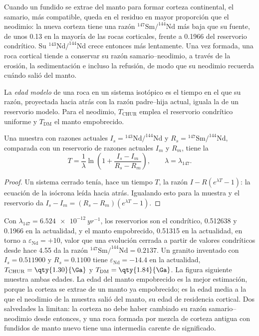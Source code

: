 Cuando un fundido se extrae del manto para formar corteza continental, el samario,
más compatible, queda en el residuo en mayor proporción que el neodimio: la nueva corteza tiene una
razón $^{147}\mathrm{Sm}/^{144}\mathrm{Nd}$ más baja que su fuente, de unos 0.13 en la mayoría de las
rocas corticales, frente a 0.1966 del reservorio condrítico. Su
$^{143}\mathrm{Nd}/^{144}\mathrm{Nd}$ crece entonces más lentamente. Una vez formada, una
roca cortical tiende a conservar su razón samario--neodimio, a través de la erosión,
la sedimentación e incluso la refusión, de modo que su neodimio recuerda cuándo salió del
manto.

\begin{definition}\label{def:b3:advanced-geochronology:model-age}
La \emph{edad modelo} de una roca en un sistema isotópico es el
tiempo en el que su razón, proyectada hacia atrás con la razón padre--hija actual,
iguala la de un reservorio modelo. Para el neodimio, $T_{\mathrm{CHUR}}$
emplea el reservorio condrítico uniforme y $T_{\mathrm{DM}}$ el manto
empobrecido.
\end{definition}

\begin{theorem}\label{thm:b3:advanced-geochronology:model-age}
Una muestra con razones actuales $I_s = {}^{143}\mathrm{Nd}/^{144}\mathrm{Nd}$ y
$R_s = {}^{147}\mathrm{Sm}/^{144}\mathrm{Nd}$, comparada con un reservorio de
razones actuales $I_m$ y $R_m$, tiene la 
\[
T = \frac1\lambda\ln\left(1 + \frac{I_s - I_m}{R_s - R_m}\right),
\qquad \lambda = \lambda_{147}.
\]
\end{theorem}

\begin{proof}
Un sistema cerrado tenía, hace un tiempo $T$, la razón $I - R(e^{\lambda T} - 1)$: la
ecuación de la isócrona leída hacia atrás. Igualando esto para la muestra y el
reservorio da $I_s - I_m = (R_s - R_m)(e^{\lambda T} - 1)$.
\end{proof}

Con $\lambda_{147} = \qty{6.524e-12}{yr^{-1}}$, los reservorios son el
condrítico, 0.512638 y 0.1966 en la actualidad, y el manto empobrecido,
0.51315 en la actualidad, en torno a $\varepsilon_{\mathrm{Nd}} = +10$, valor que una
evolución cerrada a partir de valores condríticos desde hace \qty{4.55}{\Ga} da la razón
$^{147}\mathrm{Sm}/^{144}\mathrm{Nd} = 0.2137$. Un granito inventado con
$I_s = 0.511900$ y $R_s = 0.1100$ tiene $\varepsilon_{\mathrm{Nd}} = -14.4$
en la actualidad, $T_{\mathrm{CHUR}} = \qty{1.30}{\Ga}$ y $T_{\mathrm{DM}} =
\qty{1.84}{\Ga}$. La figura siguiente muestra ambas edades. La edad del manto empobrecido es la
mejor estimación, porque la corteza se extrae de un manto ya
empobrecido; es la edad media a la que el neodimio de la muestra salió del
manto, su edad de residencia cortical. Dos salvedades la limitan: la corteza no debe
haber cambiado su razón samario--neodimio desde entonces, y una roca formada por mezcla
de corteza antigua con fundidos de manto nuevo tiene una  intermedia carente de significado.

